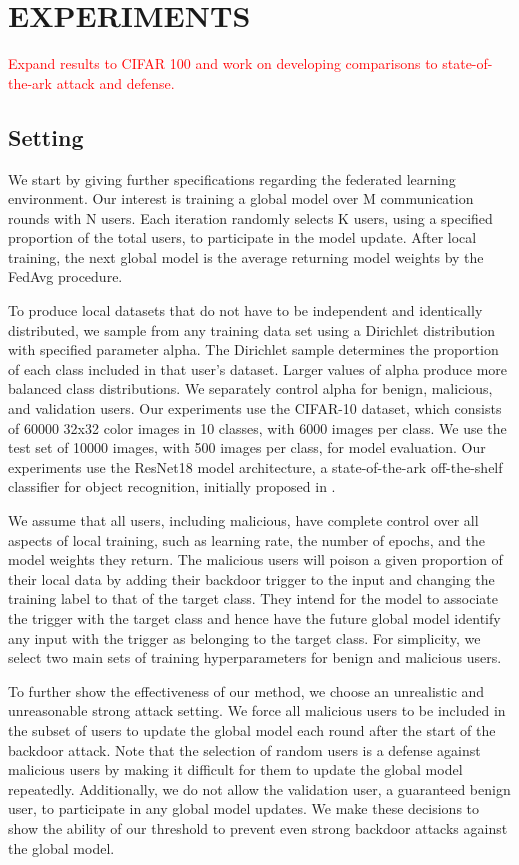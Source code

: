 \documentclass{article} %
\begin{document}
\section{EXPERIMENTS}

\textcolor{red}{Expand results to CIFAR 100 and work on developing comparisons to state-of-the-ark attack and defense.}

%
\subsection{Setting}

We start by giving further specifications regarding the federated learning environment. Our interest is training a global model over M communication rounds with N users. Each iteration randomly selects K users, using a specified proportion of the total users, to participate in the model update. After local training, the next global model is the average returning model weights by the FedAvg procedure. 

To produce local datasets that do not have to be independent and identically distributed, we sample from any training data set using a Dirichlet distribution with specified parameter alpha. The Dirichlet sample determines the proportion of each class included in that user's dataset. Larger values of alpha produce more balanced class distributions. We separately control alpha for benign, malicious, and validation users. Our experiments use the CIFAR-10 dataset, which consists of 60000 32x32 color images in 10 classes, with 6000 images per class. We use the test set of 10000 images, with 500 images per class, for model evaluation. Our experiments use the ResNet18 model architecture, a state-of-the-ark off-the-shelf classifier for object recognition, initially proposed in \cite{resnet}. 

We assume that all users, including malicious, have complete control over all aspects of local training, such as learning rate, the number of epochs, and the model weights they return. The malicious users will poison a given proportion of their local data by adding their backdoor trigger to the input and changing the training label to that of the target class. They intend for the model to associate the trigger with the target class and hence have the future global model identify any input with the trigger as belonging to the target class. For simplicity, we select two main sets of training hyperparameters for benign and malicious users. 

To further show the effectiveness of our method, we choose an unrealistic and unreasonable strong attack setting. We force all malicious users to be included in the subset of users to update the global model each round after the start of the backdoor attack. Note that the selection of random users is a defense against malicious users by making it difficult for them to update the global model repeatedly. Additionally, we do not allow the validation user, a guaranteed benign user, to participate in any global model updates. We make these decisions to show the ability of our threshold to prevent even strong backdoor attacks against the global model. 
\end{document}
